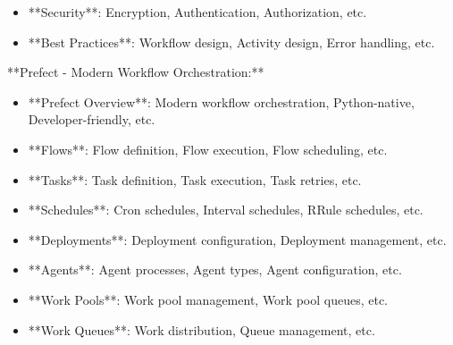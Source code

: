 \documentclass[11pt,a4paper]{article}
\begin{document}
\begin{itemize}
\item **Security**: Encryption, Authentication, Authorization, etc.
\end{itemize}

\begin{itemize}
\item **Best Practices**: Workflow design, Activity design, Error handling, etc.
\end{itemize}

**Prefect - Modern Workflow Orchestration:**

\begin{itemize}
\item **Prefect Overview**: Modern workflow orchestration, Python-native, Developer-friendly, etc.
\end{itemize}

\begin{itemize}
\item **Flows**: Flow definition, Flow execution, Flow scheduling, etc.
\end{itemize}

\begin{itemize}
\item **Tasks**: Task definition, Task execution, Task retries, etc.
\end{itemize}

\begin{itemize}
\item **Schedules**: Cron schedules, Interval schedules, RRule schedules, etc.
\end{itemize}

\begin{itemize}
\item **Deployments**: Deployment configuration, Deployment management, etc.
\end{itemize}

\begin{itemize}
\item **Agents**: Agent processes, Agent types, Agent configuration, etc.
\end{itemize}

\begin{itemize}
\item **Work Pools**: Work pool management, Work pool queues, etc.
\end{itemize}

\begin{itemize}
\item **Work Queues**: Work distribution, Queue management, etc.
\end{itemize}
\end{document}
